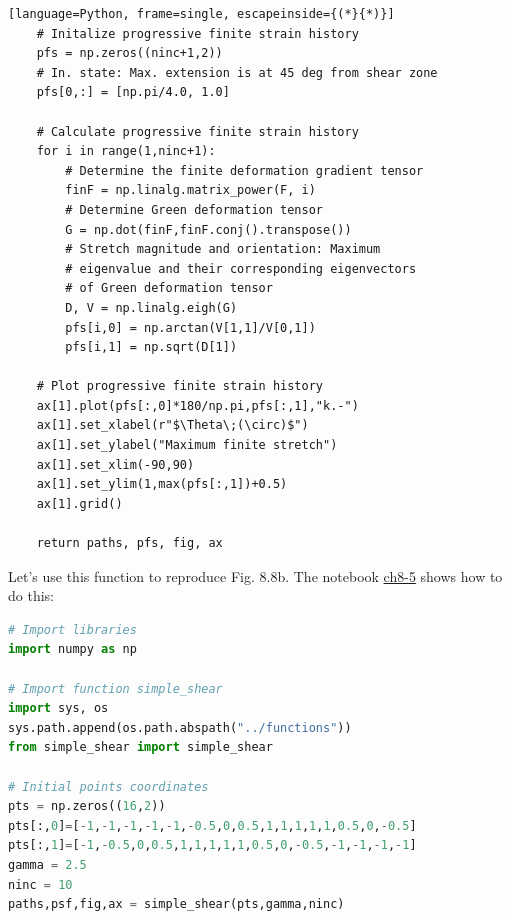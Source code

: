 \documentclass[a4paper , 12pt]{book}
\begin{document}
\begin{center}
\begin{lstlisting}[language=Python, frame=single, escapeinside={(*}{*)}]
	# Initalize progressive finite strain history
	pfs = np.zeros((ninc+1,2))
	# In. state: Max. extension is at 45 deg from shear zone
	pfs[0,:] = [np.pi/4.0, 1.0]
	
	# Calculate progressive finite strain history
	for i in range(1,ninc+1):
		# Determine the finite deformation gradient tensor
		finF = np.linalg.matrix_power(F, i)
		# Determine Green deformation tensor
		G = np.dot(finF,finF.conj().transpose())
		# Stretch magnitude and orientation: Maximum 
		# eigenvalue and their corresponding eigenvectors
		# of Green deformation tensor
		D, V = np.linalg.eigh(G)
		pfs[i,0] = np.arctan(V[1,1]/V[0,1])
		pfs[i,1] = np.sqrt(D[1])
	
	# Plot progressive finite strain history
	ax[1].plot(pfs[:,0]*180/np.pi,pfs[:,1],"k.-")
	ax[1].set_xlabel(r"$\Theta\;(\circ)$")
	ax[1].set_ylabel("Maximum finite stretch")
	ax[1].set_xlim(-90,90)
	ax[1].set_ylim(1,max(pfs[:,1])+0.5)
	ax[1].grid()
	
	return paths, pfs, fig, ax
\end{lstlisting}
\end{center}

Let's use this function to reproduce Fig. 8.8b. The notebook \href{https://github.com/nfcd/compGeo/blob/master/source/notebooks/ch8-5.ipynb}{ch8-5} shows how to do this:

\begin{center}
\begin{lstlisting}[language=Python, frame=single]
# Import libraries
import numpy as np

# Import function simple_shear
import sys, os
sys.path.append(os.path.abspath("../functions"))
from simple_shear import simple_shear

# Initial points coordinates
pts = np.zeros((16,2))
pts[:,0]=[-1,-1,-1,-1,-1,-0.5,0,0.5,1,1,1,1,1,0.5,0,-0.5]
pts[:,1]=[-1,-0.5,0,0.5,1,1,1,1,1,0.5,0,-0.5,-1,-1,-1,-1]
gamma = 2.5
ninc = 10
paths,psf,fig,ax = simple_shear(pts,gamma,ninc)
\end{lstlisting}
\end{center}
\end{document}
